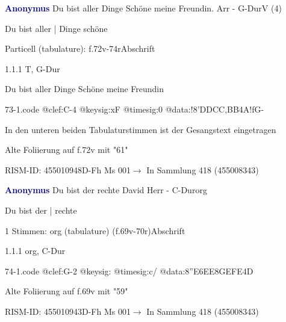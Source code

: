 \documentclass[twocolumn]{book}
\begin{document}
\par \vspace{7pt} \textcolor{darkblue}{\textbf{Anonymus  }}\hfillplus{\textbf{[73]}}\newline Du bist aller Dinge Schöne meine Freundin. Arr - G-Dur\newline V (4)
\par \begin{itshape}[f.72v, at left:] Du bist aller | Dinge schöne\end{itshape} 
\par \textcolor{darkblue}{}  Particell (tabulature): f.72v-74r\newline Abschrift
\par 1.1.1  T, G-Dur\newline \begin{footnotesize} Du bist aller Dinge Schöne meine Freundin \end{footnotesize}  
\begin{filecontents*}{73-1.code}
@clef:C-4
@keysig:xF
@timesig:0
@data:!{8'DDCC}{,BB}4A!fG-
\end{filecontents*}
\newline
%
\par In den unteren beiden Tabulaturstimmen ist der Gesangstext eingetragen
\par Alte Foliierung auf f.72v mit "61"
\par RISM-ID: 455010948\newline D-Fh  Ms 001\newline $\rightarrow$ In Sammlung 418 (455008343)
      
\par \vspace{7pt} \textcolor{darkblue}{\textbf{Anonymus  }}\hfillplus{\textbf{[74]}}\newline Du bist der rechte David Herr - C-Dur\newline org
\par \begin{itshape}[f.69v, at left:] Du bist der | rechte\end{itshape} 
\par \textcolor{darkblue}{}  1 Stimmen: org (tabulature)  (f.69v-70r)\newline Abschrift
\par 1.1.1  org, C-Dur  
\begin{filecontents*}{74-1.code}
@clef:G-2
@keysig:
@timesig:c/
@data:{8''E6EE8GE}{FE}4D
\end{filecontents*}
\newline
%
\par Alte Foliierung auf f.69v mit "59"
\par RISM-ID: 455010943\newline D-Fh  Ms 001\newline $\rightarrow$ In Sammlung 418 (455008343)
      
\end{document}
